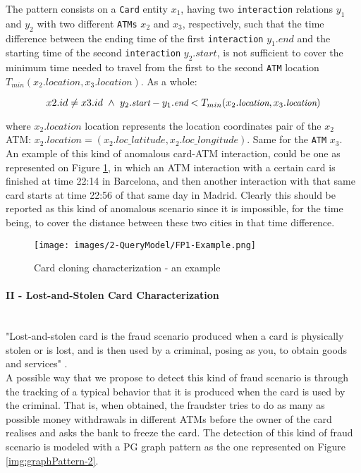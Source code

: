 The pattern consists on a \texttt{Card} entity $x_1$, having two \texttt{interaction} relations $y_1$ and $y_2$ with two different \texttt{ATMs} $x_2$ and $x_3$, respectively, such that the time difference between the ending time of the first \texttt{interaction} $y_1.\textit{end}$ and the starting time of the second \texttt{interaction} $y_2.\textit{start}$, is not sufficient to cover the minimum time needed to travel from the first to the second \texttt{ATM} location $T_{min}(x_2.\textit{location}, x_3.\textit{location})$. As a whole:

$$
\small
x2.id \ne x3.id \ \land \ y_2.\textit{start} - y_1.\textit{end} < T_{min}(x_2.\textit{location}, x_3.\textit{location})
$$

where $x_2.\textit{location}$ location represents the location coordinates pair of the $x_2$ ATM: $x_2.location = (x_2.loc\_latitude, x_2.loc\_longitude)$. Same for the \texttt{ATM} $x_3$.\\

An example of this kind of anomalous card-ATM interaction, could be one as represented on Figure \ref{img:graphPattern-1-Example}, in which an ATM interaction with a certain card is finished at time 22:14 in Barcelona, and then another interaction with that same card starts at time 22:56 of that same day in Madrid. Clearly this should be reported as this kind of anomalous scenario since it is impossible, for the time being, to cover the distance between these two cities in that time difference.

\begin{figure}[H]
  \centering
  \texttt{[image: images/2-QueryModel/FP1-Example.png]}
  \caption{Card cloning characterization - an example}
  \label{img:graphPattern-1-Example}
\end{figure}

\paragraph{II - Lost-and-Stolen Card Characterization\\\\}

"Lost-and-stolen card is the fraud scenario produced when a card is physically stolen or is lost, and is then used by a criminal, posing as you, to obtain goods and services" \cite{FP-lost-and-stolen-americanexpress2025}.\\

A possible way that we propose to detect this kind of fraud scenario is through the tracking of a typical behavior that it is produced when the card is used by the criminal. That is, when obtained, the fraudster tries to do as many as possible money withdrawals in different ATMs before the owner of the card realises and asks the bank to freeze the card. The detection of this kind of fraud scenario is modeled with a PG graph pattern as the one represented on Figure \ref{img:graphPattern-2}.

